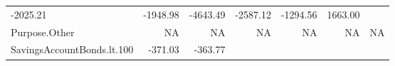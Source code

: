 \documentclass[]{article}
\begin{document}
\begin{longtable}[]{@{}lrrrrrr@{}}
\begin{minipage}[t]{0.10\columnwidth}
-2025.21\strut
\end{minipage} & \begin{minipage}[t]{0.08\columnwidth}\raggedleft\strut
-1948.98\strut
\end{minipage} & \begin{minipage}[t]{0.08\columnwidth}\raggedleft\strut
-4643.49\strut
\end{minipage} & \begin{minipage}[t]{0.08\columnwidth}\raggedleft\strut
-2587.12\strut
\end{minipage} & \begin{minipage}[t]{0.08\columnwidth}\raggedleft\strut
-1294.56\strut
\end{minipage} & \begin{minipage}[t]{0.08\columnwidth}\raggedleft\strut
1663.00\strut
\end{minipage}\tabularnewline
\begin{minipage}[t]{0.31\columnwidth}\raggedright\strut
Purpose.Other\strut
\end{minipage} & \begin{minipage}[t]{0.10\columnwidth}\raggedleft\strut
NA\strut
\end{minipage} & \begin{minipage}[t]{0.08\columnwidth}\raggedleft\strut
NA\strut
\end{minipage} & \begin{minipage}[t]{0.08\columnwidth}\raggedleft\strut
NA\strut
\end{minipage} & \begin{minipage}[t]{0.08\columnwidth}\raggedleft\strut
NA\strut
\end{minipage} & \begin{minipage}[t]{0.08\columnwidth}\raggedleft\strut
NA\strut
\end{minipage} & \begin{minipage}[t]{0.08\columnwidth}\raggedleft\strut
NA\strut
\end{minipage}\tabularnewline
\begin{minipage}[t]{0.31\columnwidth}\raggedright\strut
SavingsAccountBonds.lt.100\strut
\end{minipage} & \begin{minipage}[t]{0.10\columnwidth}\raggedleft\strut
-371.03\strut
\end{minipage} & \begin{minipage}[t]{0.08\columnwidth}\raggedleft\strut
-363.77\strut
\end{minipage} & \begin{minipage}[t]{0.08\columnwidth}\raggedleft\strut

\end{minipage}
\end{longtable}
\end{document}

